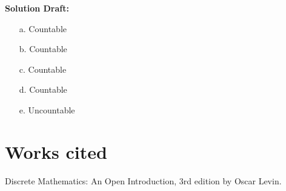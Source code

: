 \documentclass{article}
\begin{document}
\vspace{0.5cm}
\noindent\textbf{Solution Draft:} 
\vspace{0.2cm}

\begin{enumerate}
    \item[a.] Countable 
    \item[b.] Countable
    \item[c.] Countable
    \item[d.] Countable
    \item[e.] Uncountable
\end{enumerate}

\section*{Works cited}
Discrete Mathematics: An Open Introduction, 3rd edition by Oscar Levin.
\end{document}
